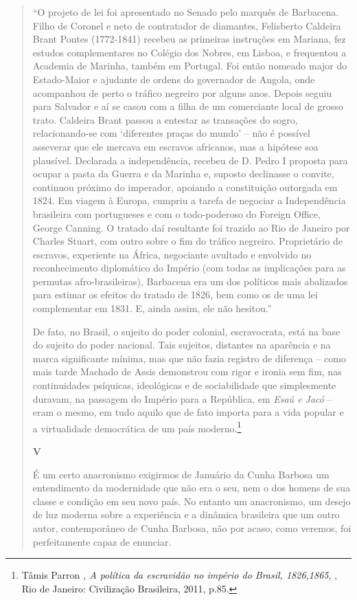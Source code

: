 \begin{quote}
``O projeto de lei foi apresentado no Senado pelo marquês de Barbacena.
Filho de Coronel e neto de contratador de diamantes, Felisberto Caldeira
Brant Pontes (1772-1841) recebeu as primeiras instruções em Mariana, fez
estudos complementares no Colégio dos Nobres, em Lisboa, e frequentou a
Academia de Marinha, também em Portugal. Foi então nomeado major do
Estado-Maior e ajudante de ordens do governador de Angola, onde
acompanhou de perto o tráfico negreiro por alguns anos. Depois seguiu
para Salvador e aí se casou com a filha de um comerciante local de
grosso trato. Caldeira Brant passou a entestar as transações do sogro,
relacionando-se com `diferentes praças do mundo' -- não é possível
asseverar que ele mercava em escravos africanos, mas a hipótese soa
plausível. Declarada a independência, recebeu de D. Pedro I proposta
para ocupar a pasta da Guerra e da Marinha e, suposto declinasse o
convite, continuou próximo do imperador, apoiando a constituição
outorgada em 1824. Em viagem à Europa, cumpriu a tarefa de negociar a
Independência brasileira com portugueses e com o todo-poderoso do
Foreign Office, George Canning. O tratado daí resultante foi trazido ao
Rio de Janeiro por Charles Stuart, com outro sobre o fim do tráfico
negreiro. Proprietário de escravos, experiente na África, negociante
avultado e envolvido no reconhecimento diplomático do Império (com todas
as implicações para as permutas afro-brasileiras), Barbacena era um dos
políticos mais abalizados para estimar os efeitos do tratado de 1826,
bem como os de uma lei complementar em 1831. E, ainda assim, ele não
hesitou.''

De fato, no Brasil, o sujeito do poder colonial, escravocrata, está na
base do sujeito do poder nacional. Tais sujeitos, distantes na aparência
e na marca significante mínima, mas que não fazia registro de diferença
-- como mais tarde Machado de Assis demonstrou com rigor e ironia sem
fim, nas continuidades psíquicas, ideológicas e de sociabilidade que
simplesmente duravam, na passagem do Império para a República, em
\emph{Esaú e Jacó} -- eram o mesmo, em tudo aquilo que de fato importa
para a vida popular e a virtualidade democrática de um país
moderno.\footnote{Tâmis Parron \emph{, A política da escravidão no
  império do Brasil, 1826,1865}, , Rio de Janeiro: Civilização
  Brasileira, 2011, p.85.}

\textbf{V}

É um certo anacronismo exigirmos de Januário da Cunha Barbosa um
entendimento da modernidade que não era o seu, nem o dos homens de sua
classe e condição em seu novo país. No entanto um anacronismo, um desejo
de luz moderna sobre a experiência e a dinâmica brasileira que um outro
autor, contemporâneo de Cunha Barbosa, não por acaso, como veremos, foi
perfeitamente capaz de enunciar.


\end{quote}
